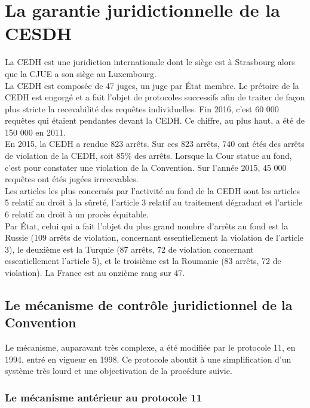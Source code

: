 \documentclass[10pt, a4paper, openany]{book}
\begin{document}
\chapter{La garantie juridictionnelle de la CESDH}

La CEDH est une juridiction internationale dont le siège est à Strasbourg alors que la CJUE a son siège au Luxembourg. \\
La CEDH est composée de 47 juges, un juge par État membre. Le prétoire de la CEDH est engorgé et a fait l'objet de protocoles successifs afin de traiter de façon plus stricte la recevabilité des requêtes individuelles. Fin 2016, c'est 60 000 requêtes qui étaient pendantes devant la CEDH. Ce chiffre, au plus haut, a été de 150 000 en 2011. \\
En 2015, la CEDH a rendue 823 arrêts. Sur ces 823 arrêts, 740 ont étés des arrêts de violation de la CEDH, soit 85\% des arrêts. Lorsque la Cour statue au fond, c'est pour constater une violation de la Convention. Sur l'année 2015, 45 000 requêtes ont étés jugées irrecevables. \\
Les articles les plus concernés par l'activité au fond de la CEDH sont les articles 5 relatif au droit à la sûreté, l'article 3 relatif au traitement dégradant et l'article 6 relatif au droit à un procès équitable.\\
Par État, celui qui a fait l'objet du plus grand nombre d'arrêts au fond est la Russie (109 arrêts de violation, concernant essentiellement la violation de l'article 3), le deuxième est la Turquie (87 arrêts, 72 de violation concernant essentiellement l'article 5), et le troisième est la Roumanie (83 arrêts, 72 de violation). La France est au onzième rang sur 47. 

\section{Le mécanisme de contrôle juridictionnel de la Convention}

Le mécanisme, auparavant très complexe, a été modifiée par le protocole 11, en 1994, entré en vigueur en 1998. Ce protocole aboutit à une simplification d'un système très lourd et une objectivation de la procédure suivie.

\subsection{Le mécanisme antérieur au protocole 11}
\end{document}
